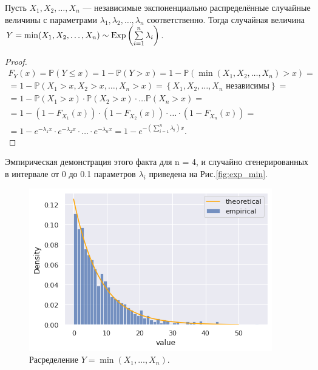 \begin{statement}
	Пусть $ X_1,X_2,\ldots,X_n $ --- независимые экспоненциально распределённые
	 случайные величины с параметрами $ \lambda_1,\lambda_2,\ldots,\lambda_n $
	 соответственно. Тогда случайная величина $ Y = \min(X_1, X_2, \dots, X_n)
	 \sim \operatorname{\mathrm{Exp}} \left( \sum\limits_{i = 1}^n \lambda_i \right) $.
\end{statement}
\begin{proof}
	\begin{multline*}
		F_Y(x) = \mathbb{P}(Y \le x) = 1 - \mathbb{P} (Y > x) = 1 - \mathbb{P}
		 (\min(X_1, X_2, \dots, X_n) > x) = \\
		= 1 - \mathbb{P}(X_1 > x, X_2 > x, \dots, X_n > x) = \left\{ X_1, X_2,
		 \dots, X_n \text{ независимы} \right\} = \\
		= 1 - \mathbb{P} (X_1 > x) \cdot \mathbb{P} (X_2 > x) \cdot \dots
		 \mathbb{P} (X_n > x) = \\
		= 1 - \left( 1 - F_{X_1}(x) \right) \cdot \left( 1 - F_{X_2}(x) \right) 
		\cdot \dots \cdot \left( 1 - F_{X_n}(x) \right) = \\
		= 1 - e^{-\lambda_1 x} \cdot e^{-\lambda_2 x} \cdot \dots \cdot
		 e^{-\lambda_n x} = 1 - e^{-\left( \sum_{i=1}^n \lambda_i \right) x}.
	\end{multline*}
\end{proof}
Эмпирическая демонстрация этого факта для n = 4, и случайно сгенерированных
 в интервале от 0 до 0.1 параметров $\lambda_i $ приведена на Рис.\eqref{fig:exp_min}.
\begin{figure}[ht]
	\centering
	\includegraphics[width = 0.8\linewidth]{"./resources/exp_min.png"}
	\caption{Расределение $ Y = \min(X_1, \dots, X_n) $.}
    \label{fig:exp_min}
\end{figure}

